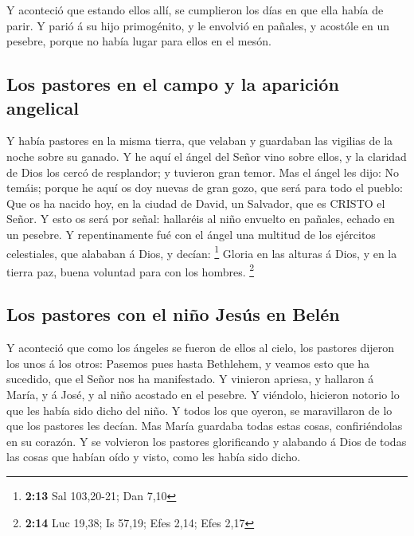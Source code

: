  Y aconteció que estando ellos allí, se cumplieron los
días en que ella había de parir.  Y parió á su hijo
primogénito, y le envolvió en pañales, y acostóle en un pesebre, porque
no había lugar para ellos en el mesón.

\hypertarget{los-pastores-en-el-campo-y-la-apariciuxf3n-angelical}{%
\subsection{Los pastores en el campo y la aparición
angelical}\label{los-pastores-en-el-campo-y-la-apariciuxf3n-angelical}}

 Y había pastores en la misma tierra, que velaban y
guardaban las vigilias de la noche sobre su ganado.  Y he
aquí el ángel del Señor vino sobre ellos, y la claridad de Dios los
cercó de resplandor; y tuvieron gran temor.  Mas el ángel
les dijo: No temáis; porque he aquí os doy nuevas de gran gozo, que será
para todo el pueblo:  Que os ha nacido hoy, en la ciudad
de David, un Salvador, que es CRISTO el Señor.  Y esto os
será por señal: hallaréis al niño envuelto en pañales, echado en un
pesebre.  Y repentinamente fué con el ángel una multitud
de los ejércitos celestiales, que alababan á Dios, y decían: \footnote{\textbf{2:13}
  Sal 103,20-21; Dan 7,10}  Gloria en las alturas á Dios,
y en la tierra paz, buena voluntad para con los hombres. \footnote{\textbf{2:14}
  Luc 19,38; Is 57,19; Efes 2,14; Efes 2,17}

\hypertarget{los-pastores-con-el-niuxf1o-jesuxfas-en-beluxe9n}{%
\subsection{Los pastores con el niño Jesús en
Belén}\label{los-pastores-con-el-niuxf1o-jesuxfas-en-beluxe9n}}

 Y aconteció que como los ángeles se fueron de ellos al
cielo, los pastores dijeron los unos á los otros: Pasemos pues hasta
Bethlehem, y veamos esto que ha sucedido, que el Señor nos ha
manifestado.  Y vinieron apriesa, y hallaron á María, y á
José, y al niño acostado en el pesebre.  Y viéndolo,
hicieron notorio lo que les había sido dicho del niño.  Y
todos los que oyeron, se maravillaron de lo que los pastores les decían.
 Mas María guardaba todas estas cosas, confiriéndolas en
su corazón.  Y se volvieron los pastores glorificando y
alabando á Dios de todas las cosas que habían oído y visto, como les
había sido dicho.

